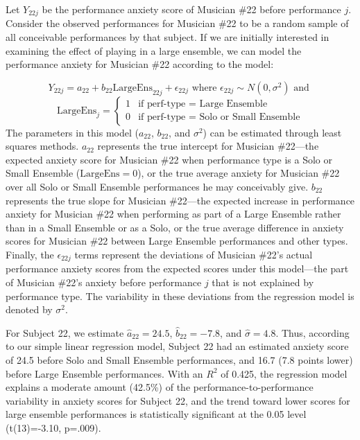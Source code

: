 \documentclass[
]{krantz}
\begin{document}
Let \(Y_{22j}\) be the performance anxiety score of Musician \#22 before performance \(j\). Consider the observed performances for Musician \#22 to be a random sample of all conceivable performances by that subject. If we are initially interested in examining the effect of playing in a large ensemble, we can model the performance anxiety for Musician \#22 according to the model:

\begin{equation}
Y_{22j}=a_{22}+b_{22}\textrm{LargeEns}_{22j}+\epsilon_{22j} \textrm{ where } \epsilon_{22j}\sim N(0,\sigma^2) \textrm{ and }
\label{eq:level1a}
\end{equation}
\[ \textrm{LargeEns}_{j} = \begin{cases}  1  & \textrm{if perf-type = Large Ensemble} \\
    0  & \textrm{if perf-type = Solo or Small Ensemble}\end{cases}\]
The parameters in this model (\(a_{22}\), \(b_{22}\), and \(\sigma^2\)) can be estimated through least squares methods. \(a_{22}\) represents the true intercept for Musician \#22---the expected anxiety score for Musician \#22 when performance type is a Solo or Small Ensemble (\(\textrm{LargeEns}=0\)), or the true average anxiety for Musician \#22 over all Solo or Small Ensemble performances he may conceivably give. \(b_{22}\) represents the true slope for Musician \#22---the expected increase in performance anxiety for Musician \#22 when performing as part of a Large Ensemble rather than in a Small Ensemble or as a Solo, or the true average difference in anxiety scores for Musician \#22 between Large Ensemble performances and other types. Finally, the \(\epsilon_{22j}\) terms represent the deviations of Musician \#22's actual performance anxiety scores from the expected scores under this model---the part of Musician \#22's anxiety before performance \(j\) that is not explained by performance type. The variability in these deviations from the regression model is denoted by \(\sigma^2\).

For Subject 22, we estimate \(\hat{a}_{22}=24.5\), \(\hat{b}_{22}=-7.8\), and \(\hat{\sigma}=4.8\). Thus, according to our simple linear regression model, Subject 22 had an estimated anxiety score of 24.5 before Solo and Small Ensemble performances, and 16.7 (7.8 points lower) before Large Ensemble performances. With an \(R^2\) of 0.425, the regression model explains a moderate amount (42.5\%) of the performance-to-performance variability in anxiety scores for Subject 22, and the trend toward lower scores for large ensemble performances is statistically significant at the 0.05 level (t(13)=-3.10, p=.009).
\end{document}
